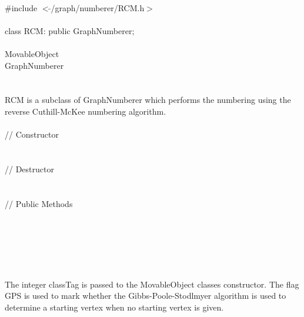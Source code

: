 

   \\
\indent \#include $<\tilde{ }$/graph/numberer/RCM.h$>$  \\

  \\
\indent class RCM: public GraphNumberer; \\

 \\
\indent MovableObject \\
\indent\indent GraphNumberer \\
\indent\indent{} \\

  \\
\indent RCM is a subclass of GraphNumberer which performs the
numbering using the reverse Cuthill-McKee numbering algorithm. \\

  \\
\indent\indent // Constructor  \\
\indent{}  \\ \\
\indent\indent // Destructor  \\
\indent{}  \\ \\
\indent\indent // Public Methods   \\
\indent{}\\
\indent{}\\
\indent{} \\
\indent{} \\

  \\
  \\
The integer \p classTag is passed to the MovableObject classes
constructor. The flag \p GPS is used to mark whether the
Gibbs-Poole-Stodlmyer algorithm is used to determine a starting vertex
when no starting vertex is given. \\

